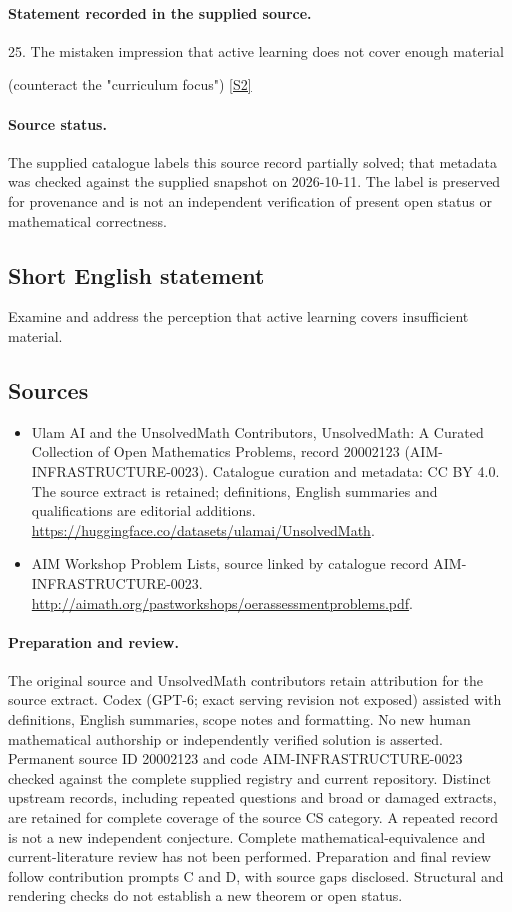 \documentclass[11pt]{article}
\newcommand{\sref}[2]{\hyperlink{source:#1:#2}{[S#2]}}
\begin{document}
\paragraph{Statement recorded in the supplied source.}
25. The mistaken impression that active learning does not cover enough material

(counteract the "curriculum focus") \sref{20002123}{2}
\paragraph{Source status.}
The supplied catalogue labels this source record partially solved; that metadata was checked against the supplied snapshot on 2026-10-11. The label is preserved for provenance and is not an independent verification of present open status or mathematical correctness.
\subsection{Short English statement}
Examine and address the perception that active learning covers insufficient material.
\subsection{Sources}
\begin{itemize}
\item[\hypertarget{source:20002123:1}{S1}] Ulam AI and the UnsolvedMath Contributors, UnsolvedMath: A Curated Collection of Open Mathematics Problems, record 20002123 (AIM-INFRASTRUCTURE-0023). Catalogue curation and metadata: CC BY 4.0. The source extract is retained; definitions, English summaries and qualifications are editorial additions.
\url{https://huggingface.co/datasets/ulamai/UnsolvedMath}.
\item[\hypertarget{source:20002123:2}{S2}] AIM Workshop Problem Lists, source linked by catalogue record AIM-INFRASTRUCTURE-0023.
\url{http://aimath.org/pastworkshops/oerassessmentproblems.pdf}.
\end{itemize}
\paragraph{Preparation and review.}
The original source and UnsolvedMath contributors retain attribution for the source extract. Codex (GPT-6; exact serving revision not exposed) assisted with definitions, English summaries, scope notes and formatting. No new human mathematical authorship or independently verified solution is asserted. Permanent source ID 20002123 and code AIM-INFRASTRUCTURE-0023 checked against the complete supplied registry and current repository. Distinct upstream records, including repeated questions and broad or damaged extracts, are retained for complete coverage of the source CS category. A repeated record is not a new independent conjecture. Complete mathematical-equivalence and current-literature review has not been performed. Preparation and final review follow contribution prompts C and D, with source gaps disclosed. Structural and rendering checks do not establish a new theorem or open status.
\label{end:20002123}
\end{document}
